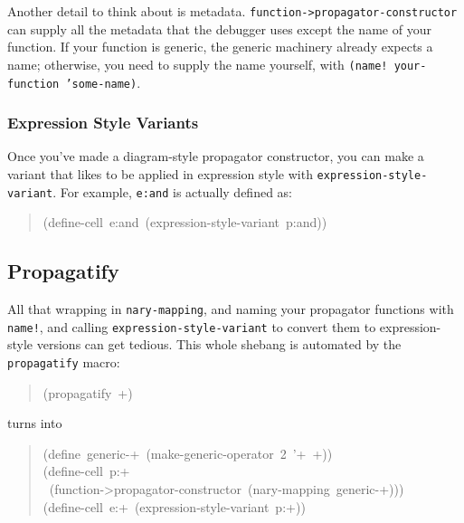 \documentclass[12pt,letterpaper,english]{article}
\begin{document}
Another detail to think about is metadata.
\texttt{function->propagator-constructor} can supply all the metadata that
the debugger uses except the name of your function.  If your function
is generic, the generic machinery already expects a name; otherwise,
you need to supply the name yourself, with \texttt{(name!  your-function
'some-name)}.



\hypertarget{expression-style-variants}{}
\subsubsection{Expression Style Variants}
\label{expression-style-variants}

Once you've made a diagram-style propagator constructor, you can make
a variant that likes to be applied in expression style with
\texttt{expression-style-variant}.  For example, \texttt{e:and} is actually
defined as:
\begin{quote}{\ttfamily \raggedright \noindent
(define-cell~e:and~(expression-style-variant~p:and))
}\end{quote}



\hypertarget{propagatify}{}
\subsection{Propagatify}
\label{propagatify}

All that wrapping in \texttt{nary-mapping}, and naming your propagator
functions with \texttt{name!}, and calling \texttt{expression-style-variant} to
convert them to expression-style versions can get tedious.  This whole
shebang is automated by the \texttt{propagatify} macro:
\begin{quote}{\ttfamily \raggedright \noindent
(propagatify~+)
}\end{quote}
turns into
\begin{quote}{\ttfamily \raggedright \noindent
(define~generic-+~(make-generic-operator~2~'+~+))~\\
(define-cell~p:+~\\
~(function->propagator-constructor~(nary-mapping~generic-+)))~\\
(define-cell~e:+~(expression-style-variant~p:+))
}\end{quote}
\end{document}
